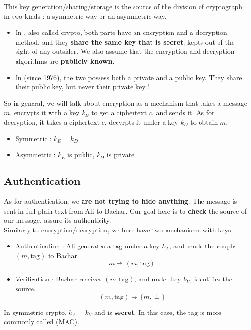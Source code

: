 \documentclass[a4paper, 12pt]{book}
\begin{document}
This key generation/sharing/storage is the source of the division of cryptograph in two kinds : a symmetric way or an asymmetric way.
\begin{itemize}
    \item In , also called  crypto, both parts have an encryption and a decryption method, and they \textbf{share the same key that is secret}, kepts out of the sight of any outsider. We also assume that the encryption and decryption algorithms are \textbf{publicly known}.
    \item In  (since 1976), the two possess both a private and a public key. They share their public key, but never their private key ! \\ 
\end{itemize}

So in general, we will talk about encryption as a mechanism that takes a message $m$, encrypts it with a key $k_E$ to get a ciphertext $c$, and sends it. As for decryption, it takes a ciphertext $c$, decyrpts it under a key $k_D$ to obtain $m$. 
\begin{itemize}
    \item Symmetric : $k_E = k_D$
    \item Asymmetric : $k_E$ is public, $k_D$ is private.
\end{itemize}

\subsection{Authentication}
As for authentication, we \textbf{are not trying to hide anything}. The message is sent in full plain-text from Ali to Bachar. Our goal here is to \textbf{check} the source of our message, assure its authenticity.\\

Similarly to encryption/decryption, we here have two mechanisms with keys :
\begin{itemize}
    \item Authentication : Ali generates a tag under a key $k_A$, and sends the couple $(m,\mathrm{tag})$ to Bachar
    $$m \Rightarrow (m, \mathrm{tag})$$
    \item Verification : Bachar receives $(m,\mathrm{tag})$, and under key $k_V$, identifies the source.
    $$(m, \mathrm{tag}) \Rightarrow \{m, \perp\}$$
\end{itemize}

In symmetric crypto, $k_A = k_V$ and is \textbf{secret}. In this case, the tag is more commonly called  (MAC). \\
\end{document}
